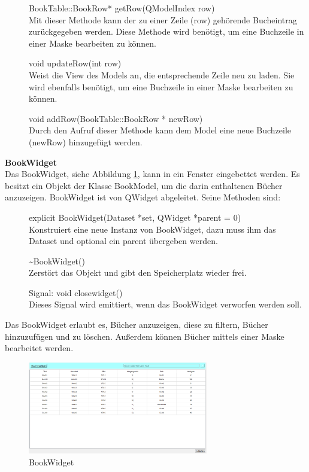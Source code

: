 \begin{description}
  \item[ ] BookTable::BookRow* getRow(QModelIndex row)\\
	Mit dieser Methode kann der zu einer Zeile (row) gehörende Bucheintrag zurückgegeben werden. Diese Methode wird benötigt, um eine Buchzeile in einer Maske bearbeiten zu können.
  \item[ ] void updateRow(int row)\\
	Weist die View des Models an, die entsprechende Zeile neu zu laden. Sie wird ebenfalls benötigt, um eine Buchzeile in einer Maske bearbeiten zu können.
  \item[ ] void addRow(BookTable::BookRow * newRow)\\
	Durch den Aufruf dieser Methode kann dem Model eine neue Buchzeile (newRow) hinzugefügt werden.	
\end{description}

\textbf{BookWidget}\\
Das BookWidget, siehe Abbildung \ref{fig:BookWidget}, kann in ein Fenster eingebettet werden. Es besitzt ein Objekt der Klasse BookModel, um die darin enthaltenen Bücher anzuzeigen. BookWidget ist von QWidget abgeleitet. Seine Methoden sind:
\begin{description}
	\item[ ] explicit BookWidget(Dataset *set, QWidget *parent = 0)\\
	Konstruiert eine neue Instanz von BookWidget, dazu muss ihm das Dataset und optional ein parent übergeben werden. 
  \item[ ] \~{}BookWidget()\\
	Zerstört das Objekt und gibt den Speicherplatz wieder frei.
	\item[ ] Signal: void closewidget()\\
	Dieses Signal wird emittiert, wenn das BookWidget verworfen werden soll.
\end{description}
Das BookWidget erlaubt es, Bücher anzuzeigen, diese zu filtern, Bücher hinzuzufügen und zu löschen. Außerdem können Bücher mittels einer Maske bearbeitet werden.
\begin{figure}[htb]
	\centering
		\includegraphics[width=0.70\textwidth]{figures/BookWidget.PNG}
	\caption{BookWidget}
	\label{fig:BookWidget}
\end{figure}
 \bigskip \\

